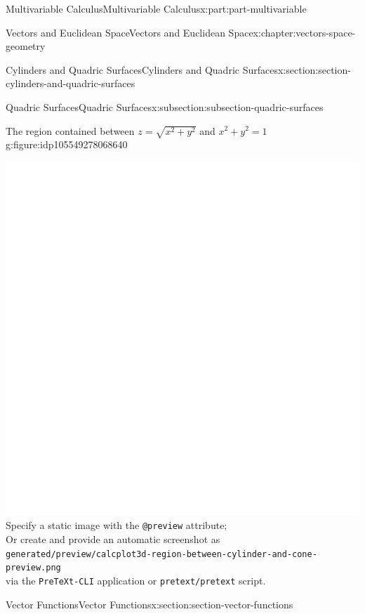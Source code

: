 \documentclass[twoside,10pt,]{book}
\newcommand{\mono}[1]{\texttt{#1}}
\numberwithin{equation}{part}
\newlength{\qrsize}
\newlength{\previewwidth}
\begin{document}
\begin{partptx}{Multivariable Calculus}{}{Multivariable Calculus}{}{}{x:part:part-multivariable}
\begin{chapterptx}{Vectors and Euclidean Space}{}{Vectors and Euclidean Space}{}{}{x:chapter:vectors-space-geometry}
\begin{sectionptx}{Cylinders and Quadric Surfaces}{}{Cylinders and Quadric Surfaces}{}{}{x:section:section-cylinders-and-quadric-surfaces}
\begin{subsectionptx}{Quadric Surfaces}{}{Quadric Surfaces}{}{}{x:subsection:subsection-quadric-surfaces}
\begin{figureptx}{The region contained between \(z = \sqrt{x^2+y^2}\) and \(x^2+y^2=1\)}{g:figure:idp105549278068640}{}
\begin{tcbraster}[raster columns=2, raster column skip=1pt, raster halign=center, raster force size=false, raster left skip=0pt, raster right skip=0pt]
\begin{tcolorbox}[previewstyle, width=\previewwidth]
{\includegraphics[width=0.80\linewidth,height=\qrsize,keepaspectratio]{generated/preview/calcplot3d-region-between-cylinder-and-cone-preview.png}}%
{\small{}Specify a static image with the \mono{@preview} attribute;\\%
Or create and provide an automatic screenshot as\\%
\mono{generated/preview/calcplot3d-region-between-cylinder-and-cone-preview.png}\\%
via the \mono{PreTeXt-CLI} application or \mono{pretext/pretext} script.}%
\end{tcolorbox}%
\begin{tcolorbox}[qrstyle]%
{\hypersetup{urlcolor=black}}%
\end{tcolorbox}%
\end{tcbraster}%
\tcblower
\end{figureptx}%
\end{subsectionptx}
\end{sectionptx}
%
%
\typeout{************************************************}
\typeout{************************************************}
%
\begin{sectionptx}{Vector Functions}{}{Vector Functions}{}{}{x:section:section-vector-functions}
\begin{introduction}{}%

\end{introduction}
\end{sectionptx}
\end{chapterptx}
\end{partptx}
\end{document}
